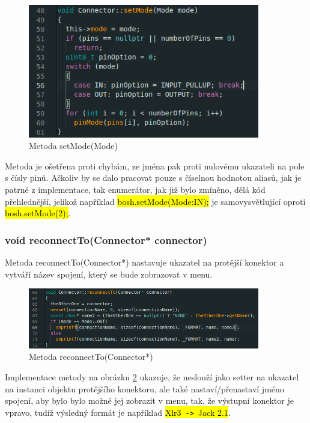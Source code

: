 \begin{figure}[H]
	\centering
	\includegraphics[width=0.9\textwidth]{pictures/setMode.png}
    	\caption{Metoda setMode(Mode)}
   	\label{fig:setMode}
\end{figure}

Metoda je ošetřena proti chybám, ze jména pak proti nulovému ukazateli na pole s čísly pinů. Ačkoliv by se dalo pracovat pouze s číselnou hodnotou aliasů, jak je patrné z implementace, tak enumerátor, jak již bylo zmíněno, dělá kód přehlednější, jelikož například \hl{bosh.setMode(Mode:IN);} je samovysvětlující oproti \hl{bosh.setMode(2);}.

\subsubsection{void reconnectTo(Connector* connector)}
Metoda reconnectTo(Connector*) nastavuje ukazatel na protější konektor a vytváří název spojení, který se bude zobrazovat v menu.

\begin{figure}[H]
	\centering
	\includegraphics[width=0.9\textwidth]{pictures/reconnect.png}
    	\caption{Metoda reconnectTo(Connector*)}
   	\label{fig:reccon}
\end{figure}

Implementace metody na obrázku \ref{fig:reccon} ukazuje, že neslouží jako setter na ukazatel na instanci objektu protějšího konektoru, ale také nastaví/přenastaví jméno spojení, aby bylo bylo možné jej zobrazit v menu, tak, že výstupní konektor je vpravo, tudíž výsledný formát je například \hl{Xlr3~\texttt{->}~Jack 2.1}.

